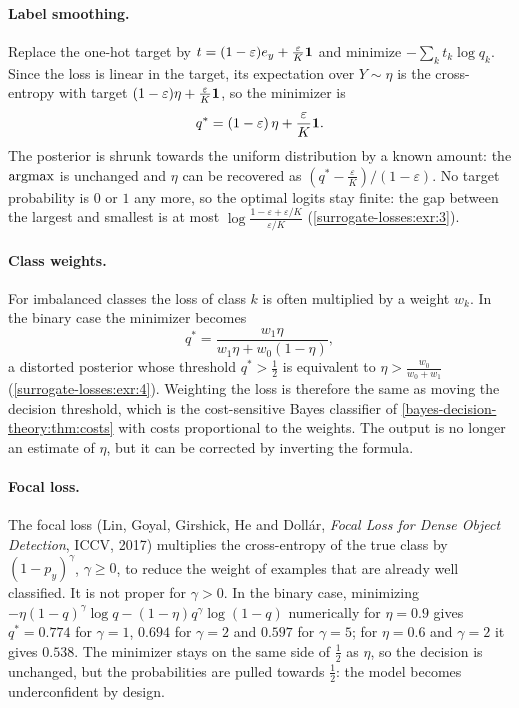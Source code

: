\begin{notechapter}
\paragraph{Label smoothing.} Replace the one-hot target by
$t = (1 - \varepsilon)e_y + \frac\varepsilon K\mathbf{1}$ and minimize $-\sum_kt_k\log q_k$. Since the loss is linear in the target,
its expectation over $Y\sim\eta$ is the cross-entropy with target $(1 - \varepsilon)\eta + \frac\varepsilon K\mathbf{1}$, so the
minimizer is
\[
  q^* = (1 - \varepsilon)\,\eta + \frac\varepsilon K\mathbf{1} .
\]
The posterior is shrunk towards the uniform distribution by a known amount: the
$\operatorname*{argmax}$ is unchanged and $\eta$ can be recovered as $(q^* - \frac\varepsilon K)/(1 - \varepsilon)$. No target
probability is $0$ or $1$ any more, so the optimal logits stay finite: the gap between
the largest and smallest is at most $\log\frac{1 - \varepsilon + \varepsilon/K}{\varepsilon/K}$ (\cref{surrogate-losses:exr:3}).

\paragraph{Class weights.} For imbalanced classes the loss of class $k$ is often
multiplied by a weight $w_k$. In the binary case the minimizer becomes
\[
  q^* = \frac{w_1\eta}{w_1\eta + w_0(1 - \eta)},
\]
a distorted posterior whose threshold $q^*>\frac12$ is equivalent to $\eta>\frac{w_0}{w_0 + w_1}$
(\cref{surrogate-losses:exr:4}). Weighting the loss is therefore the same as moving the
decision threshold, which is the cost-sensitive Bayes classifier of
\cref{bayes-decision-theory:thm:costs} with costs proportional to the weights. The output is no
longer an estimate of $\eta$, but it can be corrected by inverting the formula.

\paragraph{Focal loss.} The focal loss (Lin, Goyal, Girshick, He and Doll\'ar, \emph{Focal Loss for Dense Object Detection}, ICCV, 2017) multiplies the cross-entropy of
the true class by $(1 - p_y)^\gamma$, $\gamma\geq0$, to reduce the weight of examples that are already
well classified. It is not proper for $\gamma>0$. In the binary case, minimizing
$-\eta(1 - q)^\gamma\log q - (1 - \eta)q^\gamma\log(1 - q)$ numerically for $\eta = 0.9$ gives $q^* = 0.774$ for $\gamma = 1$,
$0.694$ for $\gamma = 2$ and $0.597$ for $\gamma = 5$; for $\eta = 0.6$ and $\gamma = 2$ it gives $0.538$. The minimizer stays
on the same side of $\frac12$ as $\eta$, so the decision is unchanged, but the probabilities are
pulled towards $\frac12$: the model becomes underconfident by design.


\end{notechapter}
